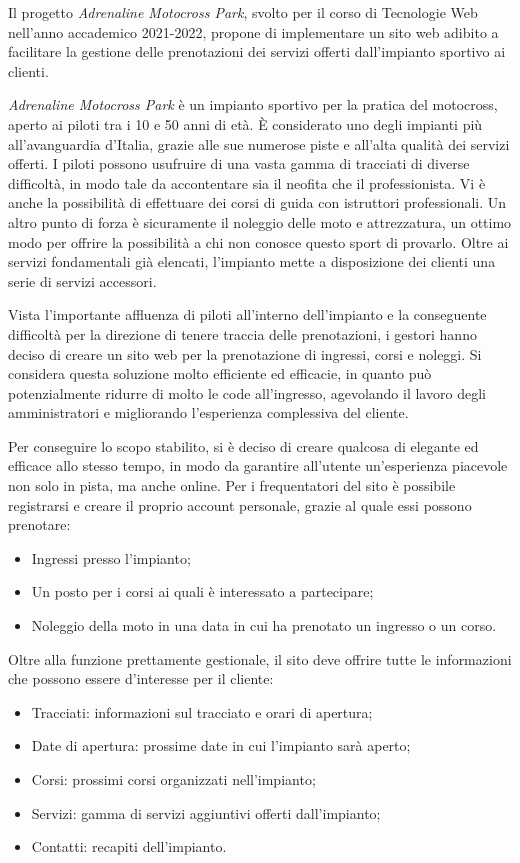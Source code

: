 Il progetto \textit{Adrenaline Motocross Park}, svolto per il corso di Tecnologie Web nell'anno accademico 2021-2022, propone di implementare un sito web adibito a facilitare la gestione delle prenotazioni dei servizi offerti dall'impianto sportivo ai clienti.

\textit{Adrenaline Motocross Park} è un impianto sportivo per la pratica del motocross, aperto ai piloti tra i 10 e 50 anni di età. È considerato uno degli impianti più all'avanguardia d'Italia, grazie alle sue numerose piste e all'alta qualità dei servizi offerti. I piloti possono usufruire di una vasta gamma di tracciati di diverse difficoltà, in modo tale da accontentare sia il neofita che il professionista. Vi è anche la possibilità di effettuare dei corsi di guida con istruttori professionali. Un altro punto di forza è sicuramente il noleggio delle moto e attrezzatura, un ottimo modo per offrire la possibilità a chi non conosce questo sport di provarlo. Oltre ai servizi fondamentali già elencati, l'impianto mette a disposizione dei clienti una serie di servizi accessori.

Vista l'importante affluenza di piloti all'interno dell'impianto e la conseguente difficoltà per la direzione di tenere traccia delle prenotazioni, i gestori hanno deciso di creare un sito web per la prenotazione di ingressi, corsi e noleggi. Si considera questa soluzione molto efficiente ed efficacie, in quanto può potenzialmente ridurre di molto le code all'ingresso, agevolando il lavoro degli amministratori e migliorando l'esperienza complessiva del cliente.

Per conseguire lo scopo stabilito, si è deciso di creare qualcosa di elegante ed efficace allo stesso tempo, in modo da garantire all'utente un'esperienza piacevole non solo in pista, ma anche online. Per i frequentatori del sito è possibile registrarsi e creare il proprio account personale, grazie al quale essi possono prenotare:
\begin{itemize}
\item Ingressi presso l'impianto;
\item Un posto per i corsi ai quali è interessato a partecipare;
\item Noleggio della moto in una data in cui ha prenotato un ingresso o un corso.
\end{itemize}

Oltre alla funzione prettamente gestionale, il sito deve offrire tutte le informazioni che possono essere d'interesse per il cliente:
\begin{itemize}
\item Tracciati: informazioni sul tracciato e orari di apertura;
\item Date di apertura: prossime date in cui l'impianto sarà aperto;
\item Corsi: prossimi corsi organizzati nell'impianto;
\item Servizi: gamma di servizi aggiuntivi offerti dall'impianto;
\item Contatti: recapiti dell'impianto.
\end{itemize}